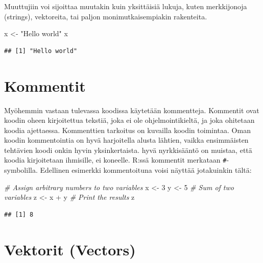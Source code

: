 \documentclass[
]{book}
\newenvironment{Shaded}{\begin{snugshade}}{\end{snugshade}}
\newcommand{\CommentTok}[1]{\textcolor[rgb]{0.56,0.35,0.01}{\textit{#1}}}
\newcommand{\DecValTok}[1]{\textcolor[rgb]{0.00,0.00,0.81}{#1}}
\newcommand{\NormalTok}[1]{#1}
\newcommand{\OtherTok}[1]{\textcolor[rgb]{0.56,0.35,0.01}{#1}}
\newcommand{\SpecialCharTok}[1]{\textcolor[rgb]{0.00,0.00,0.00}{#1}}
\newcommand{\StringTok}[1]{\textcolor[rgb]{0.31,0.60,0.02}{#1}}
\begin{document}
Muuttujiin voi sijoittaa muutakin kuin yksittäisiä lukuja, kuten merkkijonoja (strings), vektoreita, tai paljon monimutkaisempiakin rakenteita.

\begin{Shaded}
\begin{Highlighting}[]
\NormalTok{x }\OtherTok{\textless{}{-}} \StringTok{"Hello world"}
\NormalTok{x}
\end{Highlighting}
\end{Shaded}

\begin{verbatim}
## [1] "Hello world"
\end{verbatim}

\hypertarget{kommentit}{%
\section{Kommentit}\label{kommentit}}

Myöhemmin vastaan tulevassa koodissa käytetään kommentteja. Kommentit ovat koodin oheen kirjoitettua tekstiä, joka ei ole ohjelmointikieltä, ja joka ohitetaan koodia ajettaessa. Kommenttien tarkoitus on kuvailla koodin toimintaa. Oman koodin kommentointia on hyvä harjoitella alusta lähtien, vaikka ensimmäisten tehtävien koodi onkin hyvin yksinkertaista. hyvä nyrkkisääntö on muistaa, että koodia kirjoitetaan ihmisille, ei koneelle. R:ssä kommentit merkataan \texttt{\#}-symbolilla. Edellinen esimerkki kommentoituna voisi näyttää jotakuinkin tältä:

\begin{Shaded}
\begin{Highlighting}[]
\CommentTok{\# Assign arbitrary numbers to two variables}
\NormalTok{x }\OtherTok{\textless{}{-}} \DecValTok{3}
\NormalTok{y }\OtherTok{\textless{}{-}} \DecValTok{5}
\CommentTok{\# Sum of two variables}
\NormalTok{z }\OtherTok{\textless{}{-}}\NormalTok{ x }\SpecialCharTok{+}\NormalTok{ y}
\CommentTok{\# Print the results}
\NormalTok{z}
\end{Highlighting}
\end{Shaded}

\begin{verbatim}
## [1] 8
\end{verbatim}

\hypertarget{vektorit-vectors}{%
\section{Vektorit (Vectors)}\label{vektorit-vectors}}
\end{document}

